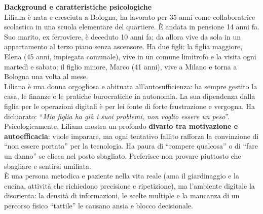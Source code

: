 ﻿\documentclass[11pt,a4paper]{article}
\begin{document}

\begin{tcolorbox}[base]
    \textbf{Background e caratteristiche psicologiche} \\[4pt]
    {\small
    Liliana è nata e cresciuta a Bologna, ha lavorato per 35 anni come collaboratrice scolastica in una scuola elementare del quartiere. È andata in pensione 14 anni fa. Suo marito, ex ferroviere, è deceduto 10 anni fa; da allora vive da sola in un appartamento al terzo piano senza ascensore. Ha due figli: la figlia maggiore, Elena (45 anni, impiegata comunale), vive in un comune limitrofo e la visita ogni martedì e sabato; il figlio minore, Marco (41 anni), vive a Milano e torna a Bologna una volta al mese. \\[4pt]

    Liliana è una donna orgogliosa e abituata all'autosufficienza: ha sempre gestito la casa, le finanze e le pratiche burocratiche in autonomia. La sua dipendenza dalla figlia per le operazioni digitali è per lei fonte di forte frustrazione e vergogna. Ha dichiarato: ``\textit{Mia figlia ha già i suoi problemi, non voglio essere un peso}''. \\[4pt]

    Psicologicamente, Liliana mostra un profondo \textbf{divario tra motivazione e autoefficacia}: vuole imparare, ma ogni tentativo fallito rafforza la convinzione di ``non essere portata'' per la tecnologia. Ha paura di ``rompere qualcosa'' o di ``fare un danno'' se clicca nel posto sbagliato. Preferisce non provare piuttosto che sbagliare e sentirsi umiliata. \\[4pt]

    È una persona metodica e paziente nella vita reale (ama il giardinaggio e la cucina, attività che richiedono precisione e ripetizione), ma l'ambiente digitale la disorienta: la densità di informazioni, le scelte multiple e la mancanza di un percorso fisico ``tattile'' le causano ansia e blocco decisionale.
    }
\end{tcolorbox}

\vspace{0.3cm}

\end{document}
